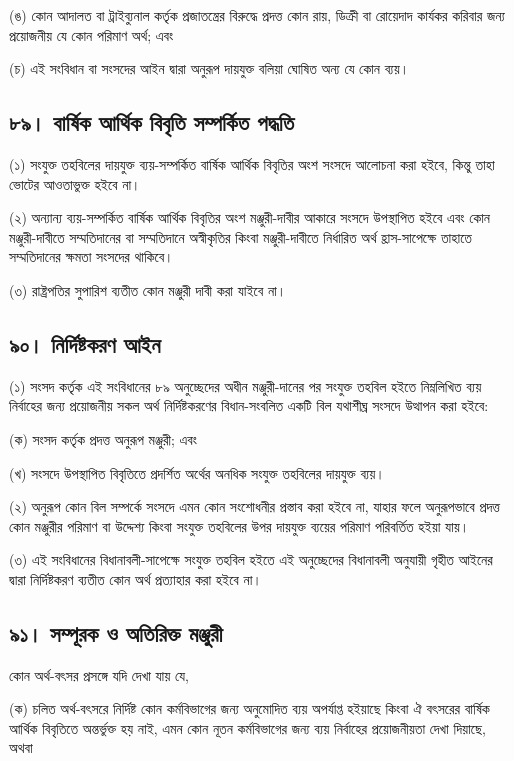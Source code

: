 \documentclass[11pt]{article}
\begin{document}
(ঙ) কোন আদালত বা ট্রাইব্যুনাল কর্তৃক প্রজাতন্ত্রের বিরুদ্ধে প্রদত্ত কোন রায়, ডিক্রী
    বা রোয়েদাদ কার্যকর করিবার জন্য প্রয়োজনীয় যে কোন পরিমাণ অর্থ; এবং

(চ) এই সংবিধান বা সংসদের আইন দ্বারা অনুরূপ দায়যুক্ত বলিয়া ঘোষিত অন্য যে কোন
    ব্যয়।

\subsection{৮৯। বার্ষিক আর্থিক বিবৃতি সম্পর্কিত পদ্ধতি}
\label{sec:org62bc14d}
(১) সংযুক্ত তহবিলের দায়যুক্ত ব্যয়-সম্পর্কিত বার্ষিক আর্থিক বিবৃতির অংশ সংসদে
    আলোচনা করা হইবে, কিন্তু তাহা ভোটের আওতাভুক্ত হইবে না।

(২) অন্যান্য ব্যয়-সম্পর্কিত বার্ষিক আর্থিক বিবৃতির অংশ মঞ্জুরী-দাবীর আকারে সংসদে
    উপস্থাপিত হইবে এবং কোন মঞ্জুরী-দাবীতে সম্মতিদানের বা সম্মতিদানে অস্বীকৃতির
    কিংবা মঞ্জুরী-দাবীতে নির্ধারিত অর্থ হ্রাস-সাপেক্ষে তাহাতে সম্মতিদানের ক্ষমতা
    সংসদের থাকিবে।

(৩) রাষ্ট্রপতির সুপারিশ ব্যতীত কোন মঞ্জুরী দাবী করা যাইবে না।

\subsection{৯০। নির্দিষ্টকরণ আইন}
\label{sec:org6a7c6b0}
(১) সংসদ কর্তৃক এই সংবিধানের ৮৯ অনুচ্ছেদের অধীন মঞ্জুরী-দানের পর সংযুক্ত
    তহবিল হইতে নিম্নলিখিত ব্যয় নির্বাহের জন্য প্রয়োজনীয় সকল অর্থ নির্দিষ্টকরণের
    বিধান-সংবলিত একটি বিল যথাশীঘ্র সংসদে উত্থাপন করা হইবে:

(ক) সংসদ কর্তৃক প্রদত্ত অনুরূপ মঞ্জুরী; এবং

(খ) সংসদে উপস্থাপিত বিবৃতিতে প্রদর্শিত অর্থের অনধিক সংযুক্ত তহবিলের দায়যুক্ত
    ব্যয়।

(২) অনুরূপ কোন বিল সম্পর্কে সংসদে এমন কোন সংশোধনীর প্রস্তাব করা হইবে না,
    যাহার ফলে অনুরূপভাবে প্রদত্ত কোন মঞ্জুরীর পরিমাণ বা উদ্দেশ্য কিংবা সংযুক্ত
    তহবিলের উপর দায়যুক্ত ব্যয়ের পরিমাণ পরিবর্তিত হইয়া যায়।

(৩) এই সংবিধানের বিধানাবলী-সাপেক্ষে সংযুক্ত তহবিল হইতে এই অনুচ্ছেদের
    বিধানাবলী অনুযায়ী গৃহীত আইনের দ্বারা নির্দিষ্টকরণ ব্যতীত কোন অর্থ প্রত্যাহার
    করা হইবে না।

\subsection{৯১। সম্পূরক ও অতিরিক্ত মঞ্জুরী}
\label{sec:org3732897}
কোন অর্থ-বৎসর প্রসঙ্গে যদি দেখা যায় যে,

(ক) চলিত অর্থ-বৎসরে নির্দিষ্ট কোন কর্মবিভাগের জন্য অনুমোদিত ব্যয় অপর্যাপ্ত
    হইয়াছে কিংবা ঐ বৎসরের বার্ষিক আর্থিক বিবৃতিতে অন্তর্ভুক্ত হয় নাই, এমন কোন নূতন
    কর্মবিভাগের জন্য ব্যয় নির্বাহের প্রয়োজনীয়তা দেখা দিয়াছে, অথবা
\end{document}
